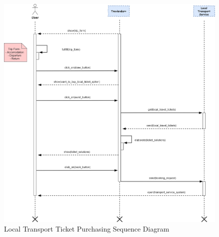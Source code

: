 \begin{figure}[H]
	\centering
	\includegraphics[scale=0.3]{Images/Sequence/Local_Transport_Ticket_Purchasing}
	\caption{Local Transport Ticket Purchasing Sequence Diagram}
\end{figure}

